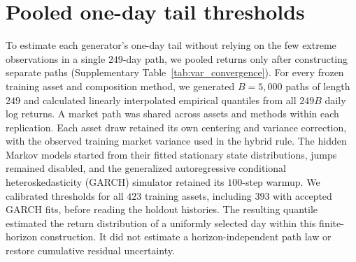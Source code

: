 \begin{table}[H]
  \centering
  \caption{\textbf{Paired control for residual centering on common
    training assets.} Native and centered results use the same
    $393$ assets and $100$ paths per asset. Centered paths have zero
    residual mean over $2{,}766$ observations. Kolmogorov--Smirnov (KS)
    and Anderson--Darling (AD) columns give non-rejection percentages
    at $\alpha=0.05$; higher values indicate closer empirical fit.
    $W_1$ is median Wasserstein-1 distance, and $|\hat\alpha-\alpha|$
    is median absolute ordinary least squares (OLS) intercept error, both in
    $\mathrm{yr}^{-1}$; lower values indicate closer agreement.
    Naive and hybrid already center each residual path.
    JumpHMM denotes the hidden Markov generator, with jumps disabled;
    SIM denotes the single-index model, and GARCH denotes generalized
    autoregressive conditional heteroskedasticity.}
  \label{tab:centering_control}
  \footnotesize
  \setlength{\tabcolsep}{3pt}
  \resizebox{\linewidth}{!}{}
\end{table}


\clearpage
\section{Pooled one-day tail thresholds}
\label{sec:supp-var-ensemble}

To estimate each generator's one-day tail without relying on the few
extreme observations in a single $249$-day path, we pooled returns
only after constructing separate paths
(Supplementary Table~\ref{tab:var_convergence}). For every frozen training
asset and composition method, we generated $B=5{,}000$ paths of
length $249$ and calculated linearly interpolated empirical quantiles
from all $249B$ daily log returns. A market path was shared across
assets and methods within each replication. Each asset draw retained
its own centering and variance correction, with the observed training
market variance used in the hybrid rule. The hidden Markov models
started from their fitted stationary state distributions, jumps
remained disabled, and the generalized autoregressive conditional
heteroskedasticity (GARCH) simulator retained its $100$-step warmup.
We calibrated thresholds for all $423$ training assets, including
$393$ with accepted GARCH fits, before reading the holdout histories.
The resulting quantile estimated the return distribution of a
uniformly selected day within this finite-horizon construction.
It did not estimate a horizon-independent path law or restore
cumulative residual uncertainty.

